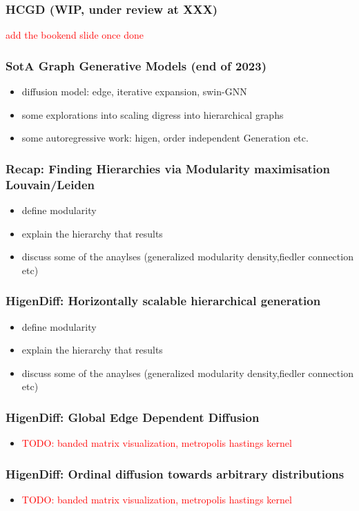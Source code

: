 \documentclass[./presentation.tex]{subfiles}
\begin{document}
\begin{frame}[t]
  \frametitle{HCGD (WIP, under review at XXX)}

  \textcolor{red}{add the bookend slide once done}
\end{frame}
\begin{frame}[label=working]
  \frametitle{SotA Graph Generative Models (end of 2023)}
  \begin{itemize}
    \item diffusion model: edge, iterative expansion, swin-GNN
    \item some explorations into scaling digress into hierarchical graphs
    \item some autoregressive work: higen, order independent Generation etc.
  \end{itemize}
\end{frame}
\begin{frame}[label=working]
  \frametitle{Recap: Finding Hierarchies via Modularity maximisation Louvain/Leiden}
  \begin{itemize}
    \item define modularity
    \item explain the hierarchy that results
    \item discuss some of the anaylses (generalized modularity density,fiedler connection etc)
  \end{itemize}
\end{frame}
\begin{frame}[label=working]
  \frametitle{HigenDiff: Horizontally scalable hierarchical generation}
  \begin{itemize}
    \item define modularity
    \item explain the hierarchy that results
    \item discuss some of the anaylses (generalized modularity density,fiedler connection etc)
  \end{itemize}
\end{frame}
\begin{frame}[label=working]
  \frametitle{HigenDiff: Global Edge Dependent Diffusion}
  \begin{itemize}
    \item \textcolor{red}{TODO: banded matrix visualization, metropolis hastings kernel}
  \end{itemize}
\end{frame}


\begin{frame}[label=working]
  \frametitle{HigenDiff: Ordinal diffusion towards arbitrary distributions}
  \begin{itemize}
    \item \textcolor{red}{TODO: banded matrix visualization, metropolis hastings kernel}
  \end{itemize}
\end{frame}
\end{document}
